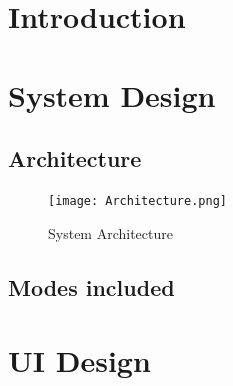 \section{Introduction}
	\paragraph{}{
	}

\section{System Design}
	\subsection{Architecture}
		\paragraph{}{
			\begin{figure}[h]
				\begin{center}
					\texttt{[image: Architecture.png]}
					\caption{System Architecture}
				\end{center}
			\end{figure}
		}
	\subsection{Modes included}
		\paragraph{}{
		}
\section{UI Design}
	\paragraph{}{
	}